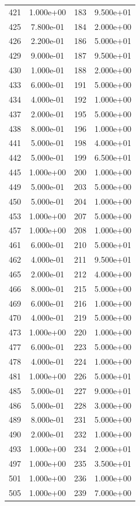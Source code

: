 \documentclass[12pt]{article}
\begin{document}
\begin{longtable}{@{}cccc@{}}
421 & 1.000e+00 & 183 & 9.500e+01 \\
425 & 7.800e-01 & 184 & 2.000e+00 \\
426 & 2.200e-01 & 186 & 5.000e+01 \\
429 & 9.000e-01 & 187 & 9.500e+01 \\
430 & 1.000e-01 & 188 & 2.000e+00 \\
433 & 6.000e-01 & 191 & 5.000e+00 \\
434 & 4.000e-01 & 192 & 1.000e+00 \\
437 & 2.000e-01 & 195 & 5.000e+00 \\
438 & 8.000e-01 & 196 & 1.000e+00 \\
441 & 5.000e-01 & 198 & 4.000e+01 \\
442 & 5.000e-01 & 199 & 6.500e+01 \\
445 & 1.000e+00 & 200 & 1.000e+00 \\
449 & 5.000e-01 & 203 & 5.000e+00 \\
450 & 5.000e-01 & 204 & 1.000e+00 \\
453 & 1.000e+00 & 207 & 5.000e+00 \\
457 & 1.000e+00 & 208 & 1.000e+00 \\
461 & 6.000e-01 & 210 & 5.000e+01 \\
462 & 4.000e-01 & 211 & 9.500e+01 \\
465 & 2.000e-01 & 212 & 4.000e+00 \\
466 & 8.000e-01 & 215 & 5.000e+00 \\
469 & 6.000e-01 & 216 & 1.000e+00 \\
470 & 4.000e-01 & 219 & 5.000e+00 \\
473 & 1.000e+00 & 220 & 1.000e+00 \\
477 & 6.000e-01 & 223 & 5.000e+00 \\
478 & 4.000e-01 & 224 & 1.000e+00 \\
481 & 1.000e+00 & 226 & 5.000e+01 \\
485 & 5.000e-01 & 227 & 9.000e+01 \\
486 & 5.000e-01 & 228 & 3.000e+00 \\
489 & 8.000e-01 & 231 & 5.000e+00 \\
490 & 2.000e-01 & 232 & 1.000e+00 \\
493 & 1.000e+00 & 234 & 2.000e+01 \\
497 & 1.000e+00 & 235 & 3.500e+01 \\
501 & 1.000e+00 & 236 & 1.000e+00 \\
505 & 1.000e+00 & 239 & 7.000e+00 \\

\end{longtable}
\end{document}
